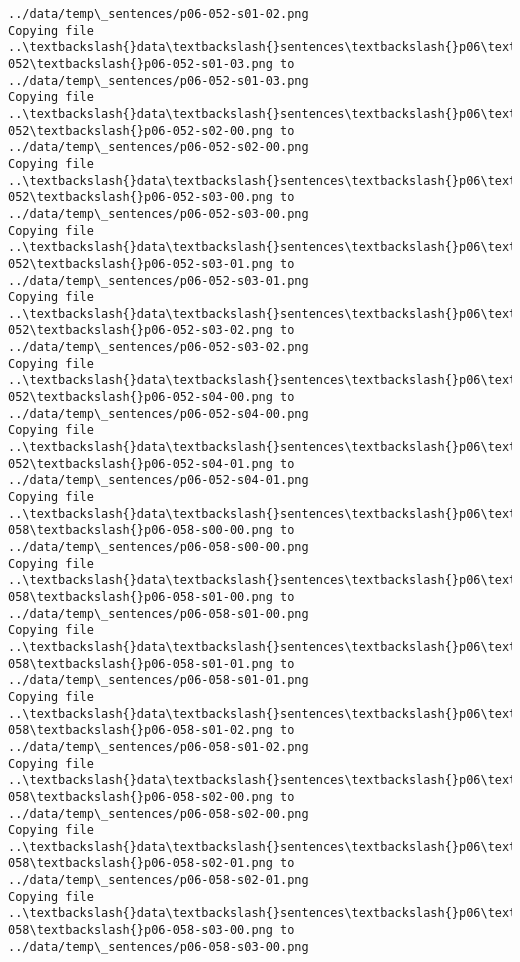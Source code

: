 \documentclass[11pt]{article}
\begin{document}
\begin{Verbatim}[commandchars=\\\{\}]
../data/temp\_sentences/p06-052-s01-02.png
Copying file ..\textbackslash{}data\textbackslash{}sentences\textbackslash{}p06\textbackslash{}p06-052\textbackslash{}p06-052-s01-03.png to
../data/temp\_sentences/p06-052-s01-03.png
Copying file ..\textbackslash{}data\textbackslash{}sentences\textbackslash{}p06\textbackslash{}p06-052\textbackslash{}p06-052-s02-00.png to
../data/temp\_sentences/p06-052-s02-00.png
Copying file ..\textbackslash{}data\textbackslash{}sentences\textbackslash{}p06\textbackslash{}p06-052\textbackslash{}p06-052-s03-00.png to
../data/temp\_sentences/p06-052-s03-00.png
Copying file ..\textbackslash{}data\textbackslash{}sentences\textbackslash{}p06\textbackslash{}p06-052\textbackslash{}p06-052-s03-01.png to
../data/temp\_sentences/p06-052-s03-01.png
Copying file ..\textbackslash{}data\textbackslash{}sentences\textbackslash{}p06\textbackslash{}p06-052\textbackslash{}p06-052-s03-02.png to
../data/temp\_sentences/p06-052-s03-02.png
Copying file ..\textbackslash{}data\textbackslash{}sentences\textbackslash{}p06\textbackslash{}p06-052\textbackslash{}p06-052-s04-00.png to
../data/temp\_sentences/p06-052-s04-00.png
Copying file ..\textbackslash{}data\textbackslash{}sentences\textbackslash{}p06\textbackslash{}p06-052\textbackslash{}p06-052-s04-01.png to
../data/temp\_sentences/p06-052-s04-01.png
Copying file ..\textbackslash{}data\textbackslash{}sentences\textbackslash{}p06\textbackslash{}p06-058\textbackslash{}p06-058-s00-00.png to
../data/temp\_sentences/p06-058-s00-00.png
Copying file ..\textbackslash{}data\textbackslash{}sentences\textbackslash{}p06\textbackslash{}p06-058\textbackslash{}p06-058-s01-00.png to
../data/temp\_sentences/p06-058-s01-00.png
Copying file ..\textbackslash{}data\textbackslash{}sentences\textbackslash{}p06\textbackslash{}p06-058\textbackslash{}p06-058-s01-01.png to
../data/temp\_sentences/p06-058-s01-01.png
Copying file ..\textbackslash{}data\textbackslash{}sentences\textbackslash{}p06\textbackslash{}p06-058\textbackslash{}p06-058-s01-02.png to
../data/temp\_sentences/p06-058-s01-02.png
Copying file ..\textbackslash{}data\textbackslash{}sentences\textbackslash{}p06\textbackslash{}p06-058\textbackslash{}p06-058-s02-00.png to
../data/temp\_sentences/p06-058-s02-00.png
Copying file ..\textbackslash{}data\textbackslash{}sentences\textbackslash{}p06\textbackslash{}p06-058\textbackslash{}p06-058-s02-01.png to
../data/temp\_sentences/p06-058-s02-01.png
Copying file ..\textbackslash{}data\textbackslash{}sentences\textbackslash{}p06\textbackslash{}p06-058\textbackslash{}p06-058-s03-00.png to
../data/temp\_sentences/p06-058-s03-00.png

\end{Verbatim}
\end{document}
